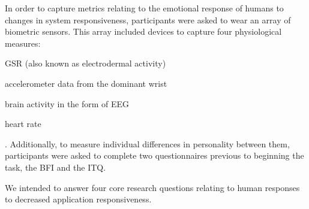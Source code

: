 In order to capture metrics relating to the emotional response of humans to changes in system responsiveness, participants were asked to wear an array of biometric sensors.
This array included devices to capture four physiological measures:
\begin{enumerate*}[itemjoin={{, }}, itemjoin*={{, and }}]
    \item \gls{GSR} (also known as electrodermal activity)
    \item accelerometer data from the dominant wrist
    \item brain activity in the form of \gls{EEG}
    \item heart rate
\end{enumerate*}.
Additionally, to measure individual differences in personality between them, participants were asked to complete two questionnaires previous to beginning the task, the \gls{BFI} and the \gls{ITQ}.





We intended to answer four core research questions relating to human responses to decreased application responsiveness.


